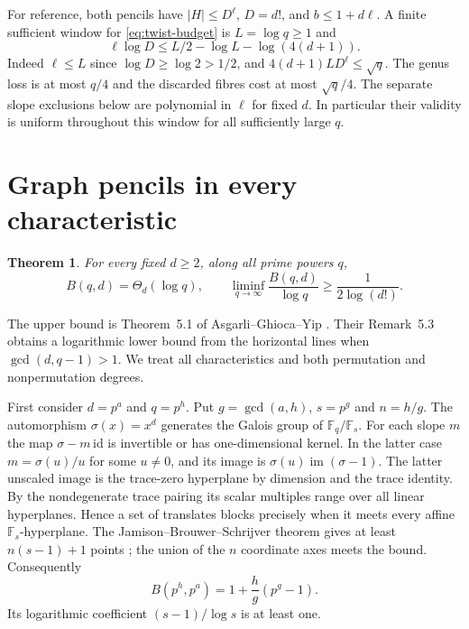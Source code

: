 \documentclass[preprint,12pt,numbers]{elsarticle}
\newtheorem{theorem}{Theorem}[section]
\begin{document}
For reference, both pencils have $|H|\le D^\ell$, $D=d!$, and
$b\le1+d\ell$. A finite sufficient window for \eqref{eq:twist-budget}
is $L=\log q\ge1$ and
\begin{equation}\label{eq:fixed-window}
       \ell\log D\le L/2-\log L-\log(4(d+1)).
\end{equation}
Indeed $\ell\le L$ since $\log D\ge\log2>1/2$, and
$4(d+1)L D^\ell\le\sqrt q$. The genus loss is at most $q/4$ and
the discarded fibres cost at most $\sqrt q/4$. The separate slope
exclusions below are polynomial in $\ell$ for fixed $d$. In
particular their validity is uniform throughout this window for
all sufficiently large $q$.

\section{Graph pencils in every characteristic}\label{sec:fixed-graph}

\begin{theorem}\label{thm:fixed-graph}
For every fixed $d\ge2$, along all prime powers $q$,
\[
 B(q,d)=\Theta_d(\log q),\qquad
 \liminf_{q\to\infty}\frac{B(q,d)}{\log q}\ge \frac1{2\log(d!)}.
\]
\end{theorem}

The upper bound is Theorem~5.1 of Asgarli--Ghioca--Yip
\cite{AGY}. Their Remark~5.3 obtains a logarithmic lower bound from the
horizontal lines when $\gcd(d,q-1)>1$. We treat all characteristics and
both permutation and nonpermutation degrees.

First consider $d=p^a$ and $q=p^h$. Put $g=\gcd(a,h)$, $s=p^g$ and
$n=h/g$. The automorphism $\sigma(x)=x^d$ generates the Galois group
of $\mathbb F_q/\mathbb F_s$. For each slope $m$ the map
$\sigma-m\,\mathrm{id}$ is invertible or has one-dimensional kernel.
In the latter case $m=\sigma(u)/u$ for some $u\ne0$, and its image is
$\sigma(u)\operatorname{im}(\sigma-1)$. The latter unscaled image is
the trace-zero hyperplane by dimension and the trace identity. By the
nondegenerate trace pairing its scalar multiples range over all linear
hyperplanes. Hence a set of translates blocks precisely when it meets
every affine $\mathbb F_s$-hyperplane. The Jamison--Brouwer--Schrijver
theorem gives at least $n(s-1)+1$ points \cite{Jamison,BS}; the union
of the $n$ coordinate axes meets the bound. Consequently
\begin{equation}\label{eq:graph-frob}
                 B(p^h,p^a)=1+\frac hg(p^g-1).
\end{equation}
Its logarithmic coefficient $(s-1)/\log s$ is at least one.
\end{document}
